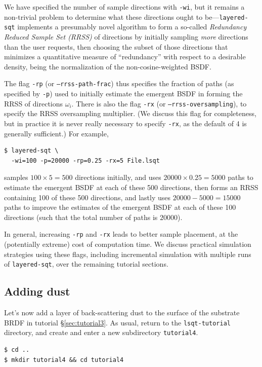 \documentclass[
    twoside,
    twocolumn,
    letterpaper,
    10pt]{article}
\begin{document}
We have specified the number of sample directions with \texttt{-wi}, but 
it remains a non-trivial problem to determine what these directions ought to 
be---\texttt{layered-sqt} implements 
a presumably novel algorithm to form a so-called \emph{Redundancy Reduced
Sample Set (RRSS)} of directions by initially sampling \emph{more} directions 
than the user requests, then choosing the subset of those directions that 
minimizes a quantitative measure of ``redundancy'' with respect to a desirable 
density, being the normalization of the non-cosine-weighted BSDF. 

The flag \texttt{-rp} (or \texttt{--rrss-path-frac}) thus specifies
the fraction of paths (as specified by \texttt{-p}) used to initially
estimate the emergent BSDF in forming the RRSS of directions $\omega_i$. 
There is also the flag \texttt{-rx} (or \texttt{--rrss-oversampling}), 
to specify the RRSS oversampling multiplier. (We discuss this flag for 
completeness, but in practice it is never really necessary to specify 
\texttt{-rx}, as the default of 4 is generally sufficient.)
For example, 
\begin{verbatim}
$ layered-sqt \
  -wi=100 -p=20000 -rp=0.25 -rx=5 File.lsqt
\end{verbatim}
samples $100\times5=500$ directions initially, and uses
$20000\times0.25=5000$ paths to estimate the emergent BSDF at each of 
these 500 directions, then forms an RRSS containing 100 of these 500 
directions, and lastly uses $20000-5000=15000$ paths to improve the 
estimates of the emergent BSDF at each of these 100 directions (such that
the total number of paths is $20000$).

In general, increasing \texttt{-rp} and \texttt{-rx} leads to better
sample placement, at the (potentially extreme) cost of computation time.
We discuss practical simulation strategies using these flags, including 
incremental simulation with multiple runs of \texttt{layered-sqt}, over
the remaining tutorial sections. 

\subsection{Adding dust}
\label{sec:tutorial4}

Let's now add a layer of back-scattering dust to the surface
of the substrate BRDF in tutorial \S\ref{sec:tutorial3}. As usual, return
to the \texttt{lsqt-tutorial} directory, and create and enter a new 
subdirectory \texttt{tutorial4}.
\begin{verbatim}
$ cd ..
$ mkdir tutorial4 && cd tutorial4
\end{verbatim}
\end{document}
